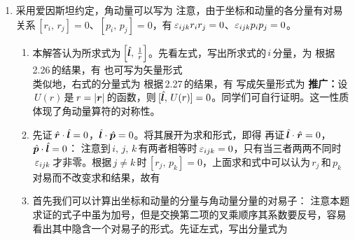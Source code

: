 \begin{enumerate}[label=2.\arabic*, leftmargin=-0.5mm]
\item
采用爱因斯坦约定，角动量可以写为
注意，由于坐标和动量的各分量有对易关系$\,[r_i,\,r_j]=0$、$[p_i,\,p_j]=0$，有$\,\varepsilon_{ijk} r_ir_j=0$、$\varepsilon_{ijk} p_ip_j=0$。
\begin{enumerate}[label=(\arabic*)]
\item
本解答认为所求式为$\,\Big[\hat{\boldsymbol{l}},\,\frac{1}{r}\Big]$。先看左式，写出所求式的$\,i\,$分量，为
根据\,2.26\,的结果，有
也可写为矢量形式
\\
类似地，右式的分量式为
根据\,2.27\,的结果，有
写成矢量形式为
\textbf{推广：}设$\,U(r)\,$是$\,r=\abs{\boldsymbol{r}}\,$的函数，则$\,[\hat{\boldsymbol{l}},\,U(r)]=0$。同学们可自行证明。这一性质体现了角动量算符的对称性。
\item
先证$\,\hat{\boldsymbol{r}}\cdot\hat{\boldsymbol{l}}=0$，$\hat{\boldsymbol{l}}\cdot\hat{\boldsymbol{p}}=0$。将其展开为求和形式，即得
再证$\,\hat{\boldsymbol{l}}\cdot\hat{\boldsymbol{r}}=0$，$\hat{\boldsymbol{p}}\cdot\hat{\boldsymbol{l}}=0$：
注意到$\,i,\,j,\,k\,$有两者相等时$\,\varepsilon_{ijk}=0$，只有当三者两两不同时$\,\varepsilon_{ijk}\,$才非零。根据$\,j\neq k\,$时$\,[r_j,\,p_k]=0$，上面求和式中可以认为$\,r_j\,$和$\,p_k\,$对易而不改变求和结果，故有
\item
首先我们可以计算出坐标和动量的分量与角动量分量的对易子：
注意本题求证的式子中虽为加号，但是交换第二项的叉乘顺序其系数要反号，容易看出其中隐含一个对易子的形式。先证左式，写出分量式为

\end{enumerate}
\end{enumerate}
